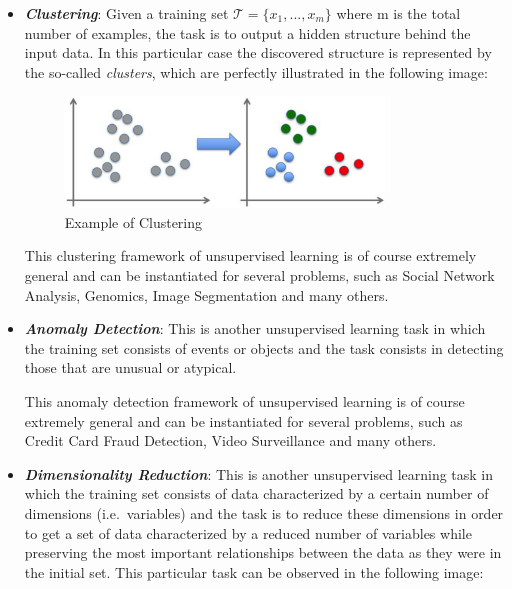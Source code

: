 \begin{itemize}
      \item \emph{\textbf{Clustering}}: Given a training set
            $\mathcal{T}=\{x_1,...,x_m\}$ where m is the total number
            of examples, the task is to output a hidden structure
            behind the input data. In this particular case the
            discovered structure is represented by the so-called
            \emph{clusters}, which are perfectly illustrated in the
            following image:

            \vspace{5mm}

            \begin{figure}[h]
                  \centering
                  \includegraphics[width=0.8\textwidth]{../img/Clustering_example}
                  \caption{Example of Clustering}
            \end{figure}

            \vspace{5mm}

            This clustering framework of unsupervised learning is of
            course extremely general and can be instantiated for
            several problems, such as Social Network Analysis, Genomics,
            Image Segmentation and many others.

      \item \emph{\textbf{Anomaly Detection}}: This is another
            unsupervised learning task in which the training set consists
            of events or objects and the task consists in detecting those
            that are unusual or atypical.

            This anomaly detection framework of unsupervised learning
            is of course extremely general and can be instantiated for
            several problems, such as Credit Card Fraud Detection,
            Video Surveillance and many others.

            \newpage

      \item \emph{\textbf{Dimensionality Reduction}}: This is another
            unsupervised learning task in which the training set consists
            of data characterized by a certain number of dimensions
            (i.e.\ variables) and the task is to reduce these dimensions
            in order to get a set of data characterized by a reduced
            number of variables while preserving the most important
            relationships between the data as they were in the initial
            set. This particular task can be observed in the following
            image:


\end{itemize}
